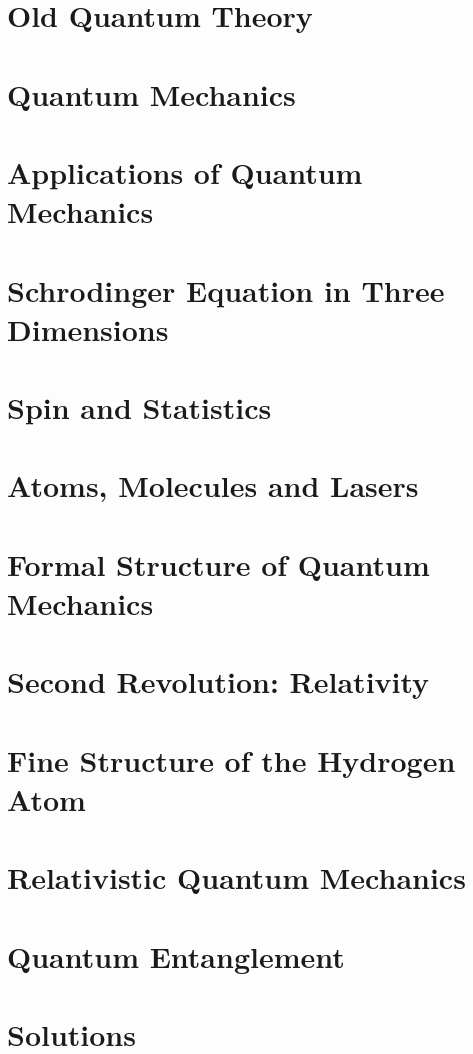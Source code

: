 \documentclass[a4paper]{article}
\begin{document}
\section{Old Quantum Theory}
\section{Quantum Mechanics}
\section{Applications of Quantum Mechanics}
\section{Schrodinger Equation in Three Dimensions}
\section{Spin and Statistics}
\section{Atoms, Molecules and Lasers}
\section{Formal Structure of Quantum Mechanics}
\section{Second Revolution: Relativity}
\section{Fine Structure of the Hydrogen Atom}
\section{Relativistic Quantum Mechanics}
\section{Quantum Entanglement}
\section{Solutions}
\end{document}

